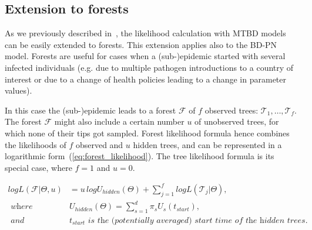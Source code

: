 \documentclass[a4paper,10pt]{article}
\begin{document}
\bigskip





\subsection{Extension to forests}

As we previously described in~\citep{zhukovaFastAccurateMaximumLikelihood2022}, the likelihood calculation with MTBD models can be easily extended to forests. This extension applies also to the BD-PN model. Forests are useful for cases when a (sub-)epidemic started with several infected individuals (e.g. due to multiple pathogen introductions to a country of interest or due to a change of health policies leading to a change in parameter values).

In this case the (sub-)epidemic leads to a forest $\mathscr{F}$ of $f$ observed trees: $\mathscr{T}_1, \ldots, \mathscr{T}_f$. The forest $\mathscr{F}$ might also include a certain number $u$ of unobserved trees, for which none of their tips got sampled.
Forest likelihood formula hence combines the likelihoods of $f$ observed and $u$ hidden trees, and can be represented in a logarithmic form~(\ref{eq:forest_likelihood}). The tree likelihood formula %
is its special case, where $f=1$ and $u=0$. 


\begin{equation}
\begin{split}
logL(\mathscr{F}|\Theta,u)&=u\,logU_{hidden}(\Theta) + \sum\limits_{j=1}^f logL(\mathscr{T}_j|\Theta), \\
\textit{ where }& U_{hidden}(\Theta)=\sum\limits_{s=1}^{d}\pi_s U_s(t_{start}),\\
\textit{ and }& t_{start} \textit{ is the (potentially averaged) start time of the hidden trees.}
\end{split} \label{eq:forest_likelihood} 
\end{equation}
\end{document}
